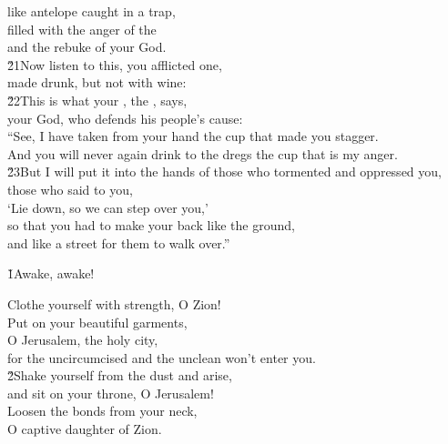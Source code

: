 \begin{poetry}
\poemlll       like antelope caught in a trap, \\
\poeml filled with the anger of the  \\
\poemll    and the rebuke of your God. \\
\poeml \v{21}Now listen to this, you afflicted one, \\
\poemll    made drunk, but not with wine: \\
\poeml \v{22}This is what your , the , says, \\
\poemll    your God, who defends his people's cause: \\
\poeml ``See, I have taken from your hand the cup that made you stagger. \\
\poemll    And you will never again drink to the dregs the cup that is my anger. \\
\poeml \v{23}But I will put it into the hands of those who tormented and oppressed you, \\
\poemll    those who said to you, \\
\poeml `Lie down, so we can step over you,' \\
\poemll    so that you had to make your back like the ground, \\
\poemlll       and like a street for them to walk over.''
\end{poetry}

\v{1}Awake, awake!

\begin{poetry}
\poemll    Clothe yourself with strength, O Zion! \\
\poeml Put on your beautiful garments, \\
\poemll    O Jerusalem, the holy city, \\
\poemlll       for the uncircumcised and the unclean won't enter you. \\
\poeml \v{2}Shake yourself from the dust and arise, \\
\poemll    and sit on your throne, O Jerusalem! \\
\poeml Loosen the bonds from your neck, \\
\poemll    O captive daughter of Zion.
\end{poetry}

